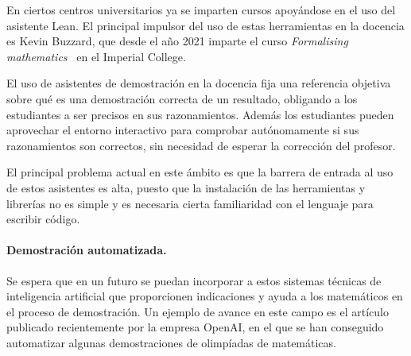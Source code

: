 En ciertos centros universitarios ya se imparten cursos apoyándose en el uso del
asistente Lean. El principal impulsor del uso de estas herramientas en la
docencia es Kevin Buzzard, que desde el año 2021 imparte el curso
\textit{Formalising mathematics}~\cite{buzzardFormalisingMathematicsFormalising}
en el Imperial College.

El uso de asistentes de demostración en la docencia fija una referencia objetiva
sobre qué es una demostración correcta de un resultado, obligando a los
estudiantes a ser precisos en sus razonamientos. Además los estudiantes pueden
aprovechar el entorno interactivo para comprobar autónomamente si sus
razonamientos son correctos, sin necesidad de esperar la corrección del
profesor.

El principal problema actual en este ámbito es que la barrera de entrada al uso
de estos asistentes es alta, puesto que la instalación de las herramientas y
librerías no es simple y es necesaria cierta familiaridad con el lenguaje para
escribir código.

\paragraph{Demostración automatizada.} Se espera que en un futuro se puedan
incorporar a estos sistemas técnicas de inteligencia artificial que proporcionen
indicaciones y ayuda a los matemáticos en el proceso de demostración. Un ejemplo
de avance en este campo es el artículo~\cite{poluSolvingFormalMath} publicado recientemente por la
empresa OpenAI, en el que se han conseguido automatizar algunas demostraciones de
olimpíadas de matemáticas.


